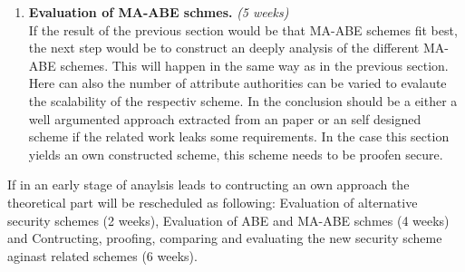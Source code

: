 \documentclass[twocolumn]{article}
\begin{document}
\begin{enumerate}
	\item\textbf{Evaluation of MA-ABE schmes.} \textit{(5 weeks)} \\  
		  If the result of the previous section would be that MA-ABE schemes fit best, the next step would be to construct an deeply analysis of the different MA-ABE schemes. This will happen in the same way as in the previous section. Here can also the number of attribute authorities can be varied to evalaute the scalability of the respectiv scheme. 
		  In the conclusion should be a either a well argumented approach extracted from an paper or an self designed scheme if the related work leaks some requirements. In the case this section yields an own constructed scheme, this scheme needs to be proofen secure. 
\end{enumerate}
If in an early stage of anaylsis leads to contructing an own approach the theoretical part will be rescheduled as following: Evaluation of alternative security schemes (2 weeks), Evaluation of ABE and MA-ABE schmes (4 weeks) and Contructing, proofing, comparing and evaluating the new security scheme aginast related schemes (6 weeks). \\
\end{document}
